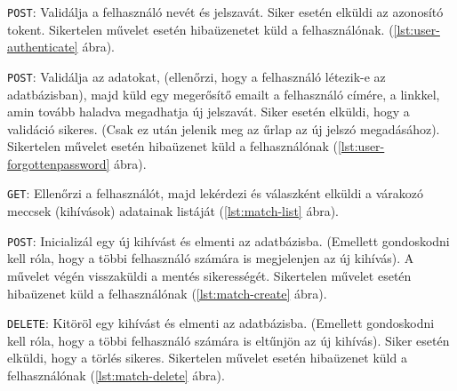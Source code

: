 

\texttt{POST}: Validálja a felhasználó nevét és jelszavát.
Siker esetén elküldi az azonosító tokent.
Sikertelen művelet esetén hibaüzenetet küld a felhasználónak. (\ref{lst:user-authenticate} ábra).



\texttt{POST}: Validálja az adatokat, (ellenőrzi, hogy a felhasználó létezik-e az adatbázisban), majd küld egy megerősítő emailt a felhasználó címére, a linkkel, amin tovább haladva megadhatja új jelszavát.
Siker esetén elküldi, hogy a validáció sikeres. (Csak ez után jelenik meg az űrlap az új jelszó megadásához).
Sikertelen művelet esetén hibaüzenet küld a felhasználónak (\ref{lst:user-forgottenpassword} ábra).




\texttt{GET}: Ellenőrzi a felhasználót, majd lekérdezi és válaszként elküldi a várakozó meccsek (kihívások) adatainak listáját (\ref{lst:match-list} ábra).



\texttt{POST}: Inicializál egy új kihívást és elmenti az adatbázisba. (Emellett gondoskodni kell róla, hogy a többi felhasználó számára is megjelenjen az új kihívás). A művelet végén visszaküldi a mentés sikerességét.
Sikertelen művelet esetén hibaüzenet küld a felhasználónak (\ref{lst:match-create} ábra).



\texttt{DELETE}: Kitöröl egy kihívást és elmenti az adatbázisba. (Emellett gondoskodni kell róla, hogy a többi felhasználó számára is eltűnjön az új kihívás).
Siker esetén elküldi, hogy a törlés sikeres.
Sikertelen művelet esetén hibaüzenet küld a felhasználónak (\ref{lst:match-delete} ábra).



